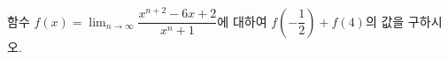 함수 $f(x)=\displaystyle\lim_{n\to\infty}\dfrac{x^{n+2}-6x+2}{x^n+1}$에 대하여 $f\left(-\dfrac{1}{2}\right)+f(4)$의 값을 구하시오. 
